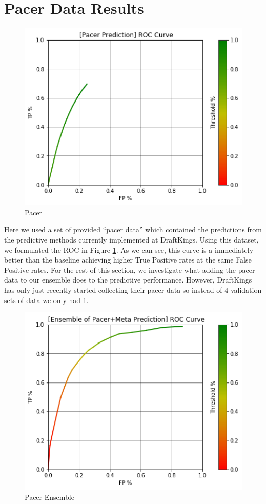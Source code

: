 \section{Pacer Data Results}

\begin{figure}[h]
\centering
\includegraphics[width=12cm]{body/results/Graphs/PacerStuff/Raw.png}
\caption{Pacer}
\label{fig:pacer}
\end{figure}

Here we used a set of provided ``pacer data'' which contained the predictions from the predictive methods currently implemented at DraftKings. Using this dataset, we formulated the ROC in Figure \ref{fig:pacer}. As we can see, this curve is a immediately better than the baseline achieving higher True Positive rates at the same False Positive rates. For the rest of this section, we investigate what adding the pacer data to our ensemble does to the predictive performance. However, DraftKings has only just recently started collecting their pacer data so instead of 4 validation sets of data we only had 1.

\pagebreak

\begin{figure}[h]
\centering
\includegraphics[width=12cm]{body/results/Graphs/PacerStuff/EnsemblePacerMeta.png}
\caption{Pacer Ensemble}
\label{fig:pacerEns}
\end{figure}

